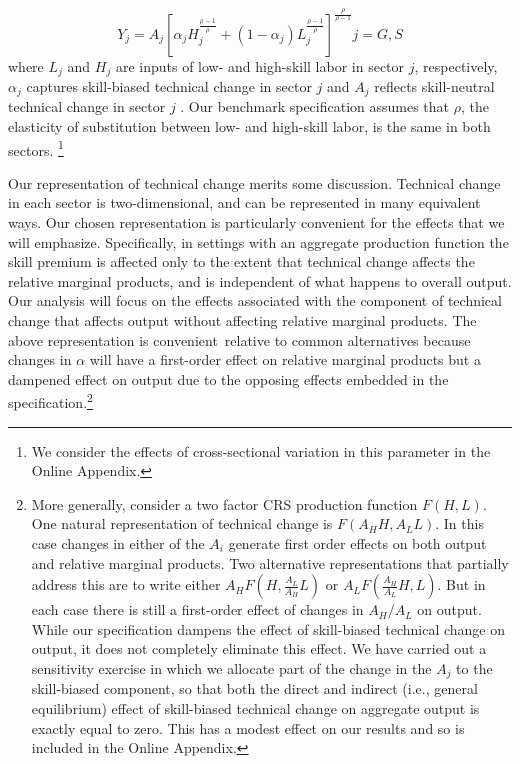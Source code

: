 \documentclass[12pt,english]{article}
\begin{document}
\begin{equation*}
Y_{j}=A_{j}\left[ \alpha _{j}H_{j}^{\frac{\rho -1}{\rho }}+\left( 1-\alpha
_{j}\right) L_{j}^{\frac{\rho -1}{\rho }}\right] ^{\frac{\rho }{\rho -1}%
}j=G,S
\end{equation*}%
where $L_{j}$ and $H_{j}$ are inputs of low- and high-skill labor in sector $%
j$, respectively, $\alpha _{j}$ captures skill-biased technical change in
sector $j$ and $A_{j}$ reflects skill-neutral technical change in sector $j$%
. Our benchmark specification assumes that $\rho $, the elasticity of
substitution between low- and high-skill labor, is the same in both sectors.%
\footnote{%
We consider the effects of cross-sectional variation in this parameter in
the Online Appendix.}

Our representation of technical change merits some discussion. Technical
change in each sector is two-dimensional, and can be represented in many
equivalent ways. Our chosen representation is particularly convenient for
the effects that we will emphasize. Specifically, in settings with an
aggregate production function the skill premium is affected only to the
extent that technical change affects the relative marginal products, and is
independent of what happens to overall output. Our analysis will focus on
the effects associated with the component of technical change that affects
output without affecting relative marginal products. The above
representation is convenient\ relative to common alternatives because
changes in $\alpha $ will have a first-order effect on relative marginal
products but a dampened effect on output due to the opposing effects
embedded in the specification.\footnote{%
More generally, consider a two factor CRS production function $F(H,L)$. One
natural representation of technical change is $F(A_{H}H,A_{L}L)$. In this
case changes in either of the $A_{i}$ generate first order effects on both
output and relative marginal products. Two alternative representations that
partially address this are to write either $A_{H}F(H,\frac{A_{L}}{A_{H}}L)$
or $A_{L}F(\frac{A_{H}}{A_{L}}H,L)$. But in each case there is still a
first-order effect of changes in $A_{H}/A_{L}$ on output. While our
specification dampens the effect of skill-biased technical change on output,
it does not completely eliminate this effect. We have carried out a
sensitivity exercise in which we allocate part of the change in the $A_{j}$
to the skill-biased component, so that both the direct and indirect (i.e.,
general equilibrium) effect of skill-biased technical change on aggregate
output is exactly equal to zero. This has a modest effect on our results and
so is included in the Online Appendix.}
\end{document}

